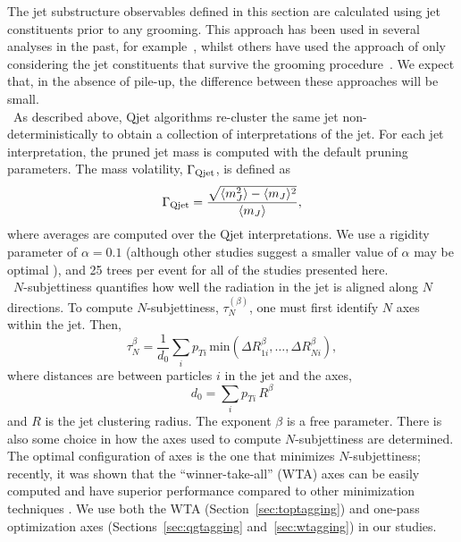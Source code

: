 The jet substructure observables defined in this section are calculated using jet constituents prior to any grooming. This approach has been used in several analyses in the past, for example~\cite{Khachatryan:2014hpa, Aad:2014haa}, whilst others have used the approach of only considering the jet constituents that survive the grooming procedure~\cite{ATL-PHYS-PUB-2014-004}. We expect that, in the absence of pile-up, the difference between these approaches will be small.\\


~As described above, Qjet algorithms re-cluster the same jet non-deterministically to obtain a collection of interpretations of the jet. For each jet interpretation, the pruned jet mass is computed with the default pruning parameters. The mass volatility, $\Gamma_{\rm Qjet}$, is defined as \cite{Ellis:2012sn}
%
\begin{equation}
\Gamma_{\rm Qjet} = \frac{\sqrt{\langle m_J^2 \rangle-\langle m_J\rangle^2}}{\langle m_J\rangle},
\end{equation}
%
where averages are computed over the Qjet interpretations. We use a rigidity parameter of $\alpha=0.1$ (although other studies suggest a smaller value of $\alpha$ may be optimal \cite{Ellis:2012sn,Ellis:2014eya}), and 25 trees per event for all of the studies presented here.\\

~$N$-subjettiness \cite{Thaler:2010tr} quantifies how well the radiation in the jet is aligned along $N$ directions. To compute $N$-subjettiness, $\tau_N^{(\beta)}$, one must first identify $N$ axes within the jet. Then,
%
\begin{equation}
\tau_N^{\beta} = \frac{1}{d_0} \sum_i p_{Ti} \,\mathrm{min}\left( \Delta R_{1i}^\beta,\ldots,\Delta R_{Ni}^\beta\right),
\end{equation}
%
where distances are between particles $i$ in the jet and the axes,
%
\begin{equation}
d_0 = \sum_i p_{Ti}\,R^\beta
\end{equation}
%
and $R$ is the jet clustering radius. The exponent $\beta$ is a free parameter. There is also some choice in how the axes used to compute $N$-subjettiness are determined. The optimal configuration of axes is the one that minimizes
$N$-subjettiness; recently, it was shown that the ``winner-take-all'' (WTA) axes can be easily computed and have superior performance compared to other minimization techniques \cite{Larkoski:2014uqa}. We use both the WTA (Section~\ref{sec:toptagging}) and one-pass \kT optimization axes (Sections~\ref{sec:qgtagging} and~\ref{sec:wtagging}) in our studies.

